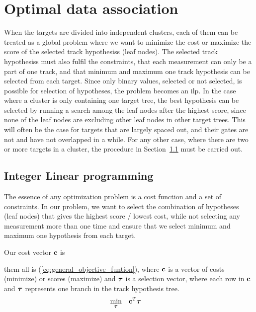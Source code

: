 \section{Optimal data association}
When the targets are divided into independent clusters, each of them can be treated as a global problem where we want to minimize the cost or maximize the score of the selected \glspl{track hypothesis} (leaf nodes). The selected \glspl{track hypothesis} must also fulfil the constraints, that each measurement can only be a part of one track, and that minimum and maximum one track hypothesis can be selected from each target. Since only binary values, selected or not selected, is possible for selection of hypotheses, the problem becomes an \gls{ilp}. In the case where a cluster is only containing one target tree, the best hypothesis can be selected by running a search among the leaf nodes after the highest score, since none of the leaf nodes are excluding other leaf nodes in other target trees. This will often be the case for targets that are largely spaced out, and their gates are not and have not overlapped in a while. For any other case, where there are two or more targets in a cluster, the procedure in Section~\ref{subsec:integer_linear_programming} must be carried out. 

\subsection{Integer Linear programming}\label{subsec:integer_linear_programming}
The essence of any optimization problem is a cost function and a set of constraints. In our problem, we want to select the combination of hypotheses (leaf nodes) that gives the highest score / lowest cost, while not selecting any measurement more than one time and ensure that we select minimum and maximum one hypothesis from each target.



Our cost vector \(\boldsymbol{\mathbf{c}}\) is 

 them all is (\ref{eq:general_objective_funtion}), where \(\boldsymbol{\mathbf{c}}\) is a vector of costs (minimize) or scores (maximize) and \(\boldsymbol{\mathbf{\tau}}\) is a selection vector, where each row in \(\boldsymbol{\mathbf{c}}\) and \(\boldsymbol{\mathbf{\tau}}\) represents one branch in the track hypothesis tree.
\begin{equation}
\begin{aligned}
& \underset{\boldsymbol{\mathbf{\tau}}}{\text{min}}
& & \boldsymbol{\mathbf{c}}^T \boldsymbol{\mathbf{\tau}}
\end{aligned}
\label{eq:general_objective_funtion}
\end{equation}


